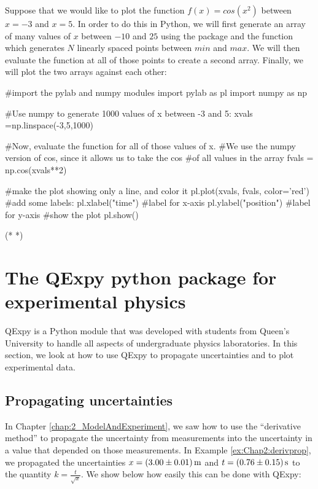 Suppose that we would like to plot the function $f(x) = cos(x^2)$ between $x=-3$ and $x=5$. In order to do this in Python, we will first generate an array of many values of $x$ between $-10$ and $25$ using the  package and the function  which generates $N$ linearly spaced points between $min$ and $max$. We will then evaluate the function at all of those points to create a second array. Finally, we will plot the two arrays against each other:
\begin{python}[caption=Plotting a function of 1 variable]
#import the pylab and numpy modules
import pylab as pl
import numpy as np

#Use numpy to generate 1000 values of x between -3 and 5:
xvals =np.linspace(-3,5,1000)

#Now, evaluate the function for all of those values of x.
#We use the numpy version of cos, since it allows us to take the cos 
#of all values in the array
fvals = np.cos(xvals**2)

#make the plot showing only a line, and color it
pl.plot(xvals, fvals, color='red')
#add some labels:
pl.xlabel("time") #label for x-axis
pl.ylabel("position") #label for y-axis
#show the plot
pl.show()

\end{python}
\begin{poutput}
(*   *)
\end{poutput}

\section{The QExpy python package for experimental physics}
QExpy is a Python module that was developed with students from Queen's University to handle all aspects of undergraduate physics laboratories. In this section, we look at how to use QExpy to propagate uncertainties and to plot experimental data.

\subsection{Propagating uncertainties}
In Chapter \ref{chap:2_ModelAndExperiment}, we saw how to use the ``derivative method'' to propagate the uncertainty from measurements into the uncertainty in a value that depended on those measurements. In Example \ref{ex:Chap2:derivprop}, we propagated the uncertainties $x=\SI{3.00 \pm 0.01}{m}$ and $t=\SI{0.76\pm0.15}{s}$ to the quantity $k=\frac{t}{\sqrt x}$. We show below how easily this can be done with QExpy:

